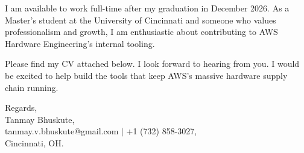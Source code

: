 \documentclass[11pt]{letter}
\begin{document}
\begin{letter}{}
I am available to work full-time after my graduation in December 2026. As a Master's student at the University of Cincinnati and someone who values professionalism and growth, I am enthusiastic about contributing to AWS Hardware Engineering's internal tooling.

Please find my CV attached below. I look forward to hearing from you. I would be excited to help build the tools that keep AWS's massive hardware supply chain running.

{\setlength{\parskip}{0pt}
Regards,\\
Tanmay Bhuskute,\\
tanmay.v.bhuskute@gmail.com $\mid$ +1 (732) 858-3027,\\
Cincinnati, OH.
}

\end{letter}
\end{document}
